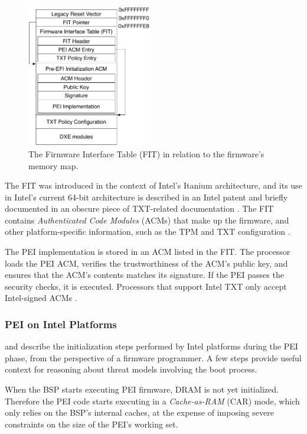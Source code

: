 \begin{figure}[hbt]
  \centering
  \includegraphics[width=55mm]{figures/firmware_fit.pdf}
  \caption{
    The Firmware Interface Table (FIT) in relation to the firmware's memory
    map.
  }
  \label{fig:firmware_fit}
\end{figure}

The FIT \cite{qureshi2006fit} was introduced in the context of Intel's Itanium
architecture, and its use in Intel's current 64-bit architecture is described
in an Intel patent \cite{datta2013acm} and briefly documented in an obscure
piece of TXT-related documentation \cite{intel2010txtlab}. The FIT contains
\textit{Authenticated Code Modules} (ACMs) that make up the firmware, and
other platform-specific information, such as the TPM and TXT configuration
\cite{intel2010txtlab}.

The PEI implementation is stored in an ACM listed in the FIT. The processor
loads the PEI ACM, verifies the trustworthiness of the ACM's public key, and
ensures that the ACM's contents matches its signature. If the PEI passes the
security checks, it is executed. Processors that support Intel TXT only accept
Intel-signed ACMs \cite[p. 92]{futral2013servertxt}.


\subsubsection{PEI on Intel Platforms}
\label{sec:uefi_pei_details}

\cite{intel2010booting} and \cite{coreboot2015manual} describe the
initialization steps performed by Intel platforms during the PEI phase, from
the perspective of a firmware programmer. A few steps provide useful context
for reasoning about threat models involving the boot process.


When the BSP starts executing PEI firmware, DRAM is not yet initialized.
Therefore the PEI code starts executing in a \textit{Cache-as-RAM} (CAR) mode,
which only relies on the BSP's internal caches, at the expense of imposing
severe constraints on the size of the PEI's working set.


